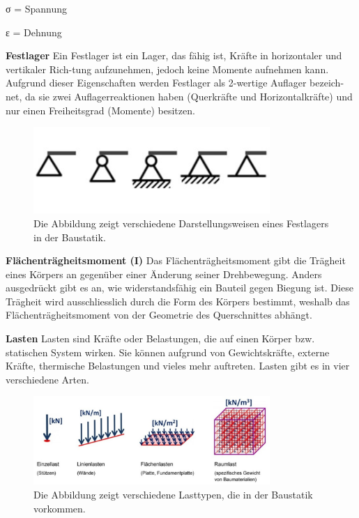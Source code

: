 σ = Spannung

ε = Dehnung

\textbf{Festlager}
Ein Festlager ist ein Lager, das fähig ist, Kräfte in horizontaler und vertikaler Rich-tung aufzunehmen, jedoch keine Momente aufnehmen kann.
Aufgrund dieser Eigenschaften werden Festlager als 2-wertige Auflager bezeich-net, da sie zwei Auflagerreaktionen haben (Querkräfte und Horizontalkräfte) und nur einen Freiheitsgrad (Momente) besitzen.
\begin{figure} [h]
	\centering
	\includegraphics[width=0.8\textwidth]{papers/balken/images/teil1/Festlager.jpg}
	\caption{Die Abbildung zeigt verschiedene Darstellungsweisen eines Festlagers in der Baustatik.}
	\label{fig:Die Abbildung zeigt verschiedene Darstellungsweisen eines Festlagers in der Baustatik.}
\end{figure}

\textbf{Flächenträgheitsmoment (I)}
Das Flächenträgheitsmoment gibt die Trägheit eines Körpers an gegenüber einer Änderung seiner Drehbewegung.
Anders ausgedrückt gibt es an, wie widerstandsfähig ein Bauteil gegen Biegung ist.
Diese Trägheit wird ausschliesslich durch die Form des Körpers bestimmt, weshalb das Flächenträgheitsmoment von der Geometrie des Querschnittes abhängt.

\textbf{Lasten}
Lasten sind Kräfte oder Belastungen, die auf einen Körper bzw. statischen System wirken.
Sie können aufgrund von Gewichtskräfte, externe Kräfte, thermische Belastungen und vieles mehr auftreten.
Lasten gibt es in vier verschiedene Arten.
\begin{figure} [h]
	\centering
	\includegraphics[width=0.8\textwidth]{papers/balken/images/teil1/Lasten.jpg}
	\caption{Die Abbildung zeigt verschiedene Lasttypen, die in der Baustatik vorkommen.}
	\label{fig:Die Abbildung zeigt verschiedene Lasttypen, die in der Baustatik vorkommen.}
\end{figure}

